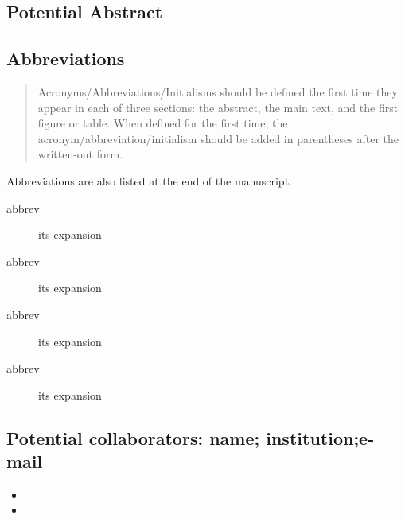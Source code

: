 \documentclass[10pt,letterpaper]{article}
\newcommand{\bi}{\begin{itemize}}
\newcommand{\ei}{\end{itemize}}
\begin{document}
\subsection*{Potential Abstract}




\subsection{Abbreviations}
\label{sub:abbrev}



\begin{quote}
   Acronyms/Abbreviations/Initialisms should be defined the first time they appear in each of three sections: the abstract, the main text, and the first figure or table. When defined for the first time, the acronym/abbreviation/initialism should be added in parentheses after the written-out form.
\end{quote}

Abbreviations are also listed at the end of the manuscript.

\begin{description}
    \item[abbrev] its expansion 
    \item[abbrev] its expansion 
    \item[abbrev] its expansion 
    \item[abbrev] its expansion 
\end{description}



\subsection{Potential collaborators: name; institution;e-mail}
\label{sub:collaborators}

\bi
\item 
\item
\ei
\end{document}
